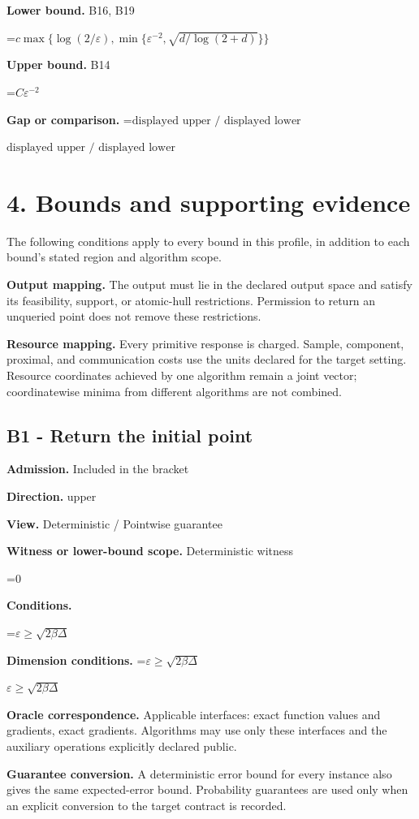 \documentclass[10pt,a4paper]{article}
\newcommand{\AtlasMath}[1]{\par\begingroup\centering\setbox0=\hbox{$\displaystyle #1$}\ifdim\wd0>1.4\linewidth\typeout{ATLAS WIDE FORMULA: \the\wd0}\fi\ifdim\wd0>\linewidth\resizebox{\linewidth}{!}{\box0}\else\box0\fi\par\endgroup}
\newcommand{\AtlasInlineMath}[1]{\begingroup\setbox0=\hbox{$#1$}\ifdim\wd0>.4\linewidth\endgroup\AtlasMath{#1}\else\endgroup$#1$\fi}
\begin{document}
\textbf{Lower bound.} B16, B19

\AtlasMath{c\max\{\log(2/\varepsilon),\min\{\varepsilon^{-2},\sqrt{d/\log(2+d)}\}\}}
\textbf{Upper bound.} B14

\AtlasMath{C\varepsilon^{-2}}
\textbf{Gap or comparison.} \AtlasInlineMath{\text{displayed upper / displayed lower}}

\section{4. Bounds and supporting evidence}
The following conditions apply to every bound in this profile, in addition to each bound's stated region and algorithm scope.

\textbf{Output mapping.} The output must lie in the declared output space and satisfy its feasibility, support, or atomic-hull restrictions. Permission to return an unqueried point does not remove these restrictions.

\textbf{Resource mapping.} Every primitive response is charged. Sample, component, proximal, and communication costs use the units declared for the target setting. Resource coordinates achieved by one algorithm remain a joint vector; coordinatewise minima from different algorithms are not combined.

\subsection{B1 - Return the initial point}
\textbf{Admission.} Included in the bracket

\textbf{Direction.} upper

\textbf{View.} Deterministic / Pointwise guarantee

\textbf{Witness or lower-bound scope.} Deterministic witness

\AtlasMath{0}
\textbf{Conditions.} 
\AtlasMath{\varepsilon\ge\sqrt{2\beta\Delta}}


\textbf{Dimension conditions.} \AtlasInlineMath{\varepsilon\ge\sqrt{2\beta\Delta}}

\textbf{Oracle correspondence.} Applicable interfaces: exact function values and gradients, exact gradients. Algorithms may use only these interfaces and the auxiliary operations explicitly declared public.

\textbf{Guarantee conversion.} A deterministic error bound for every instance also gives the same expected-error bound. Probability guarantees are used only when an explicit conversion to the target contract is recorded.
\end{document}
